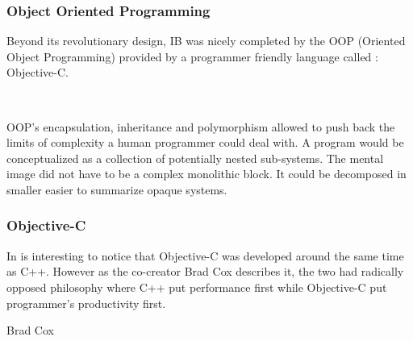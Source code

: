 \subsubsection{Object Oriented Programming}
Beyond its revolutionary design, IB was nicely completed by the OOP (Oriented Object Programming) provided by a programmer friendly language called : Objective-C.\\
\par
{}\\
\par
OOP's encapsulation, inheritance and polymorphism allowed to push back the limits of complexity a human programmer could deal with. A program would be conceptualized as a collection of potentially nested sub-systems. The mental image did not have to be a complex monolithic block. It could be decomposed in smaller easier to summarize opaque systems.\\

\par
\subsubsection{Objective-C}
In is interesting to notice that Objective-C was developed around the same time as C++. However as the co-creator Brad Cox describes it, the two had radically opposed philosophy where C++ put performance first while Objective-C put programmer's productivity first.\\
\par
{} {Brad Cox}\\
\par


